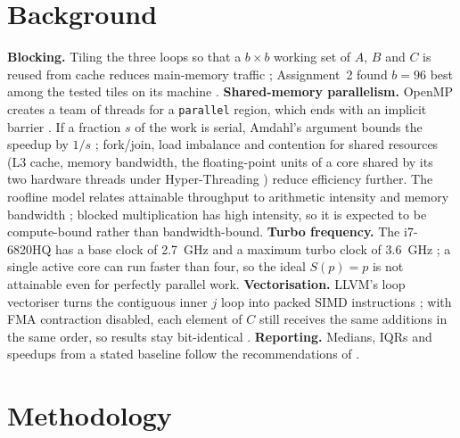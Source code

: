 \section{Background}
\textbf{Blocking.} Tiling the three loops so that a $b\times b$ working set of $A$, $B$ and $C$ is reused from cache reduces
main-memory traffic \cite{lam,goto}; Assignment~2 found $b=96$ best among the tested tiles on its machine \cite{a2}.
\textbf{Shared-memory parallelism.} OpenMP creates a team of threads for a \texttt{parallel} region, which ends with an implicit
barrier \cite{openmp}. If a fraction $s$ of the work is serial, Amdahl's argument bounds the speedup by $1/s$ \cite{amdahl};
fork/join, load imbalance and contention for shared resources (L3 cache, memory bandwidth, the floating-point units of a
core shared by its two hardware threads under Hyper-Threading \cite{marr}) reduce efficiency further. The roofline model
relates attainable throughput to arithmetic intensity and memory bandwidth \cite{roofline}; blocked multiplication has high
intensity, so it is expected to be compute-bound rather than bandwidth-bound. \textbf{Turbo frequency.} The i7-6820HQ has
a base clock of 2.7~GHz and a maximum turbo clock of 3.6~GHz \cite{nbc}; a single active core can run faster than four, so the
ideal $S(p)=p$ is not attainable even for perfectly parallel work. \textbf{Vectorisation.} LLVM's loop vectoriser turns the
contiguous inner $j$ loop into packed SIMD instructions \cite{llvmvec}; with FMA contraction disabled, each element of $C$ still
receives the same additions in the same order, so results stay bit-identical \cite{higham}. \textbf{Reporting.} Medians,
IQRs and speedups from a stated baseline follow the recommendations of \cite{hoefler}.

\section{Methodology}
